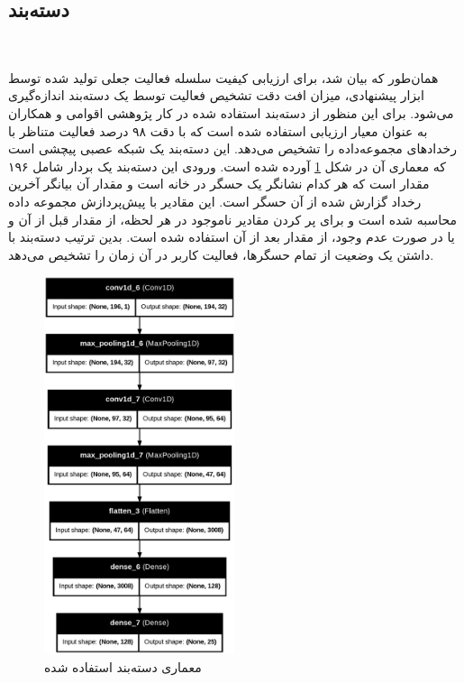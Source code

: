 \subsection{دسته‌بند}‌

همان‌طور که بیان شد، برای ارزیابی کیفیت سلسله فعالیت‌ جعلی تولید شده توسط ابزار پیشنهادی، میزان افت دقت تشخیص فعالیت توسط یک دسته‌بند اندازه‌گیری می‌شود. برای این منظور از دسته‌بند استفاده شده در کار پژوهشی اقوامی و همکاران \cite{x3341} به عنوان معیار ارزیابی استفاده شده است که با دقت ۹۸ درصد فعالیت متناظر با رخدادهای مجموعه‌داده  را تشخیص می‌دهد. این دسته‌بند یک شبکه عصبی پیچشی است که معماری آن در شکل \ref{fig:fO4H5} آورده شده است. ورودی این دسته‌بند یک بردار شامل ۱۹۶ مقدار است که هر کدام نشانگر یک حسگر در خانه است و مقدار آن بیانگر آخرین رخداد گزارش شده از آن حسگر است. این مقادیر با پیش‌پردازش مجموعه داده محاسبه شده است و برای پر کردن مقادیر ناموجود در هر لحظه، از مقدار قبل از آن و یا در صورت عدم وجود، از مقدار بعد از آن استفاده شده است. بدین ترتیب دسته‌بند با داشتن یک وضعیت از تمام حسگرها، فعالیت کاربر در آن زمان را تشخیص می‌دهد.


\begin{figure}[H]
\centerline{\includegraphics[width=0.5\textwidth]{figs/fO4H5.png}}
\caption{معماری دسته‌بند استفاده شده}
\label{fig:fO4H5}
\end{figure}

